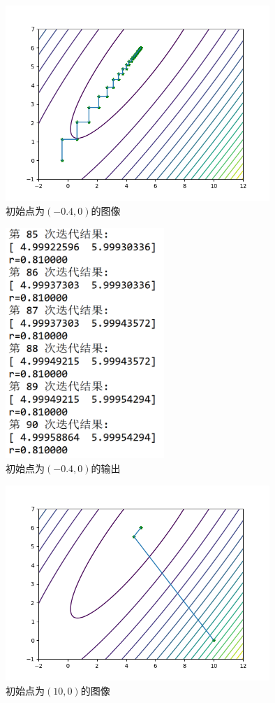\documentclass[UTF8]{ctexart}
\begin{document}
\begin{enumerate}
\begin{figure}[H]
\small
\centering
\includegraphics[width=10cm]{5.png}
\caption{初始点为$(-0.4,0)$的图像}
\end{figure}

\begin{figure}[H]
\small
\centering
\includegraphics[width=6cm]{6.png}
\caption{初始点为$(-0.4,0)$的输出}
\end{figure}

\begin{figure}[H]
\small
\centering
\includegraphics[width=10cm]{7.png}
\caption{初始点为$(10,0)$的图像}
\end{figure}


\end{enumerate}
\end{document}
